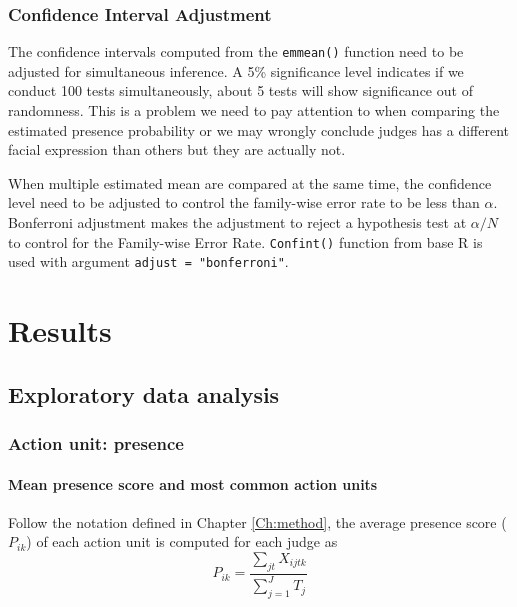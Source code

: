 \documentclass{monashthesis}
\begin{document}
\hypertarget{confidence-interval-adjustment}{%
\subsection{Confidence Interval Adjustment}\label{confidence-interval-adjustment}}

The confidence intervals computed from the \texttt{emmean()} function need to be adjusted for simultaneous inference. A 5\% significance level indicates if we conduct 100 tests simultaneously, about 5 tests will show significance out of randomness. This is a problem we need to pay attention to when comparing the estimated presence probability or we may wrongly conclude judges has a different facial expression than others but they are actually not.

When multiple estimated mean are compared at the same time, the confidence level need to be adjusted to control the family-wise error rate to be less than \(\alpha\). Bonferroni adjustment makes the adjustment to reject a hypothesis test at \(\alpha/N\) to control for the Family-wise Error Rate. \texttt{Confint()} function from base R is used with argument \texttt{adjust\ =\ "bonferroni"}.

\let\cleardoublepage\clearpage

\hypertarget{results}{%
\chapter{Results}\label{results}}

\hypertarget{exploratory-data-analysis}{%
\section{Exploratory data analysis}\label{exploratory-data-analysis}}

\hypertarget{action-unit-presence}{%
\subsection{Action unit: presence}\label{action-unit-presence}}

\hypertarget{mean-presence-score-and-most-common-action-units}{%
\subsubsection{Mean presence score and most common action units}\label{mean-presence-score-and-most-common-action-units}}

Follow the notation defined in Chapter \ref{Ch:method}, the average presence score (\(P_{ik}\)) of each action unit is computed for each judge as \[P_{ik} = \frac{\sum_{jt}X_{ijtk}}{\sum_{j = 1}^JT_j}\]
\end{document}
